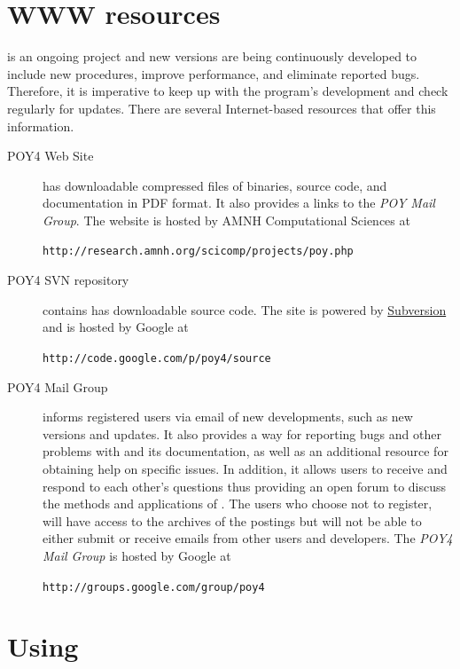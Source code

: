 \section{WWW resources}
\poy is an ongoing project and new versions are being continuously developed to include new procedures, improve performance, and eliminate reported bugs. Therefore, it is imperative to keep up with the program's development and check regularly for updates. There are several Internet-based resources that offer this information.

\begin{description}
\item[POY4 Web Site] has downloadable compressed files of \poy binaries, source code, and documentation in PDF format. It also provides a links to the \emph{POY Mail Group}. The website is hosted by AMNH Computational Sciences at 
\begin{center}
\texttt{http://research.amnh.org/scicomp/projects/poy.php}
\end{center}

\item[POY4 SVN repository] contains has downloadable \poy source code.  The site is powered by \href{http://subversion.tigris.org/}{Subversion} and is hosted by Google at 
\begin{center}
\texttt{http://code.google.com/p/poy4/source}
\end{center}

\item[POY4 Mail Group] informs registered users via email of new developments, such as new versions and updates. It also provides a way for reporting bugs and other problems with \poy and its documentation, as well as an additional resource for obtaining help on specific issues. In addition, it allows users to receive and respond to each other's questions thus providing an open forum to  discuss the methods and applications of \poy. The users who choose not to register, will have access to the archives of the postings but will not be able to either submit or receive emails from other users and \poy developers. The \emph{POY4 Mail Group} is hosted  by Google at
	\begin{center}
	\texttt{http://groups.google.com/group/poy4}
	\end{center}
	
\end{description}

\section{Using \poy}

